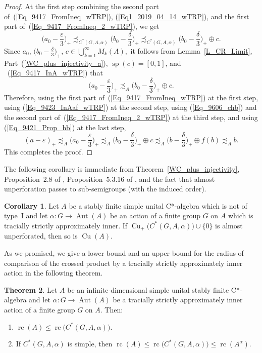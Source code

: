 \documentclass[10pt]{amsart}
\numberwithin{equation}{section}
\theoremstyle{definition}
\newtheorem{thm}{Theorem}[section]
\newtheorem{cor}[thm]{Corollary}
\newcommand{\af}{\alpha}
\newcommand{\dt}{\delta}
\newcommand{\ep}{\varepsilon}
\newcommand{\Cu}{{\operatorname{Cu}}}
\newcommand{\spec}{{\operatorname{sp}}}
\newcommand{\Aut}{{\operatorname{Aut}}}
\newcommand{\rc}{{\operatorname{rc}}}
\newcommand{\ca}{C*-algebra}
\newcommand{\CGAa}{C^* (G, A, \af)}
\newcommand{\I}{\infty}
\begin{document}
\begin{proof}
At the first step
combining the second part of~(\ref{Eq_9417_FromIneq_wTRP}),
(\ref{Eq1_2019_04_14_wTRP}),
and the first part of~(\ref{Eq_9417_FromIneq_2_wTRP}),
we get
%
\begin{equation}\label{Eq_9417_InA_wTRP}
\Big( a_0 - \frac{\ep}{3} \Big)_{+}
  \precsim_{\CGAa} \Big( b_0 - \frac{\dt}{3} \Big)_{+}
  \precsim_{\CGAa} \Big( b_0 - \frac{\dt}{3} \Big)_{+} \oplus c.
\end{equation}
%
Since
$
a_0, \, \Big( b_0 - \frac{\dt}{3} \Big)_{+}, \, c
  \in \bigcup_{k = 1}^{\I} M_k (A),
$
it follows from Lemma~\ref{L_CR_Limit},
Part~(\ref{WC_plus_injectivity_a}), $\spec (c)=[0, 1]$, and
~(\ref{Eq_9417_InA_wTRP}) that
%
\begin{equation}\label{Eq_9423_InAaf_wTRP}
\Big( a_0 - \frac{\ep}{3} \Big)_{+}
  \precsim_{A} \Big( b_0 - \frac{\dt}{3} \Big)_{+} \oplus c.
\end{equation}
%
Therefore, using the first part of~(\ref{Eq_9417_FromIneq_wTRP}) at the first step,
using (\ref{Eq_9423_InAaf_wTRP}) at the second step,
using (\ref{Eq_9606_chb}) 
and the second part of~(\ref{Eq_9417_FromIneq_2_wTRP}) at the third step,
and using (\ref{Eq_9421_Prop_hb}) at the last step,
\[
(a - \ep)_{+}
 \precsim_{A} \Big( a_0 - \frac{\ep}{3} \Big)_{+}
 \precsim_{A} \Big( b_0 - \frac{\dt}{3} \Big)_{+} \oplus c
 \precsim_{A} \Big( b - \frac{\dt}{3} \Big)_{+} \oplus f (b)
 \precsim_{A} b.
\]
This completes the proof.
\end{proof}
%
The following corollary is immediate from Theorem~\ref{WC_plus_injectivity}, Proposition~2.8 of \cite{Th20},
Proposition~5.3.16 of \cite{APT18},
 and the fact that  almost unperforation passes to sub-semigroups (with the induced order).
\begin{cor}
Let $A$ be a stably finite simple unital \ca{} which is not of type~I
and let $\alpha \colon G \to \Aut (A)$
be an action of a finite group $G$ on $A$
which is tracially strictly approximately inner.
If $\Cu_+ \big(C^*(G, A, \alpha)\big) \cup \{ 0 \}$ is almost unperforated, then so is $\Cu (A)$.
\end{cor}
%
As we promised, we give a lower bound and an upper bound for 
the radius of comparison of the crossed product by a tracially strictly approximately inner action in the following theorem.
%
\begin{thm}\label{Th_rc_Tr_inner}
Let $A$ be an infinite-dimensional simple  unital stably finite  \ca{}
and let  $\alpha \colon  G \to \Aut(A)$ be a tracially strictly  approximately  inner action of a 
finite group $G$ on $A$. Then:
\begin{enumerate}
\item\label{Th_rc_Tr_inner.a}
$\rc (A) \leq \rc \big( \CGAa\big)$.
\item\label{Th_rc_Tr_inner.b}
If $C^*(G, A, \alpha)$ is simple, then $\rc (A) \leq \rc \big(C^*(G, A, \alpha)\big) \leq \rc (A^{\alpha})$.
\end{enumerate}
\end{thm}
\end{document}
